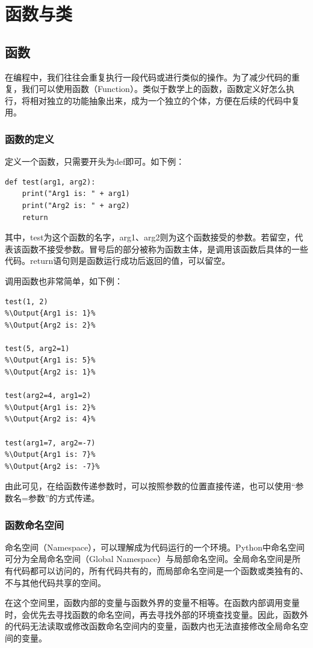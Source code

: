 \documentclass[../../Main.tex]{subfiles}
\begin{document}
\section{函数与类\PyOnly }

\subsection{函数}
在编程中，我们往往会重复执行一段代码或进行类似的操作。为了减少代码的重复，我们可以使用函数（Function）。类似于数学上的函数，函数定义好怎么执行，将相对独立的功能抽象出来，成为一个独立的个体，方便在后续的代码中复用。

\subsubsection{函数的定义}
定义一个函数，只需要开头为def即可。如下例：
\begin{lstlisting}
def test(arg1, arg2):
    print("Arg1 is: " + arg1)
    print("Arg2 is: " + arg2)
    return
\end{lstlisting}

其中，test为这个函数的名字，arg1、arg2则为这个函数接受的参数。若留空，代表该函数不接受参数。冒号后的部分被称为函数主体，是调用该函数后具体的一些代码。return语句则是函数运行成功后返回的值，可以留空。

调用函数也非常简单，如下例：
\begin{lstlisting}
test(1, 2)
%\Output{Arg1 is: 1}%
%\Output{Arg2 is: 2}%

test(5, arg2=1)
%\Output{Arg1 is: 5}%
%\Output{Arg2 is: 1}%

test(arg2=4, arg1=2)
%\Output{Arg1 is: 2}%
%\Output{Arg2 is: 4}%

test(arg1=7, arg2=-7)
%\Output{Arg1 is: 7}%
%\Output{Arg2 is: -7}%
\end{lstlisting}

由此可见，在给函数传递参数时，可以按照参数的位置直接传递，也可以使用“参数名=参数”的方式传递。

\subsubsection{函数命名空间}
命名空间（Namespace），可以理解成为代码运行的一个环境。Python中命名空间可分为全局命名空间（Global Namespace）与局部命名空间。全局命名空间是所有代码都可以访问的，所有代码共有的，而局部命名空间是一个函数或类独有的、不与其他代码共享的空间。

在这个空间里，函数内部的变量与函数外界的变量不相等。在函数内部调用变量时，会优先去寻找函数的命名空间，再去寻找外部的环境查找变量。因此，函数外的代码无法读取或修改函数命名空间内的变量，函数内也无法直接修改全局命名空间的变量。
\end{document}
